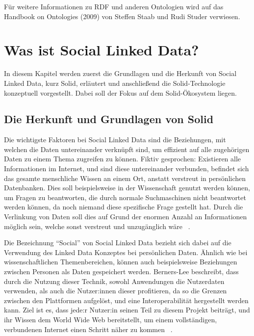 \documentclass[acmtog]{acmart}
\begin{document}
Für weitere Informationen zu RDF und anderen Ontologien wird auf das Handbook on Ontologies (2009) von Steffen Staab und Rudi Studer verwiesen.~\cite{staab2009handbook}

\section{Was ist Social Linked Data?} \label{section:wasIstSocialLinkedData}

In diesem Kapitel werden zuerst die Grundlagen und die Herkunft von Social Linked Data, kurz Solid, erläutert und anschließend die Solid-Technologie konzeptuell vorgestellt. Dabei soll der Fokus auf dem Solid-Ökosystem liegen.

\subsection{Die Herkunft und Grundlagen von Solid}

Die wichtigste Faktoren bei Social Linked Data sind die Beziehungen, mit welchen die Daten untereinander verknüpft sind, um effizient auf alle zugehörigen Daten zu einem Thema zugreifen zu können. Fiktiv gesprochen: Existieren alle Informationen im Internet, und sind diese untereinander verbunden, befindet sich das gesamte menschliche Wissen an einem Ort, anstatt verstreut in persönlichen Datenbanken. Dies soll beispielsweise in der Wissenschaft genutzt werden können, um Fragen zu beantworten, die durch normale Suchmaschinen nicht beantwortet werden können, da noch niemand diese spezifische Frage gestellt hat. Durch die Verlinkung von Daten soll dies auf Grund der enormen Anzahl an Informationen möglich sein, welche sonst verstreut und unzugänglich wäre ~\cite{TED.2010}.

Die Bezeichnung "`Social"' von Social Linked Data bezieht sich dabei auf die Verwendung des Linked Data Konzeptes bei persönlichen Daten. Ähnlich wie bei wissenschaftlichen Themenbereichen, können auch beispielsweise Beziehungen zwischen Personen als Daten gespeichert werden. Berners-Lee beschreibt, dass durch die Nutzung dieser Technik, sowohl Anwendungen die Nutzerdaten verwenden, als auch die Nutzer:innen dieser profitieren, da so die Grenzen zwischen den Plattformen aufgelöst, und eine Interoperabilität hergestellt werden kann. Ziel ist es, dass jede:r Nutzer:in seinen Teil zu diesem Projekt beiträgt, und ihr Wissen dem World Wide Web bereitstellt, um einem vollständigen, verbundenen Internet einen Schritt näher zu kommen  ~\cite{TED.2010}.
\end{document}
